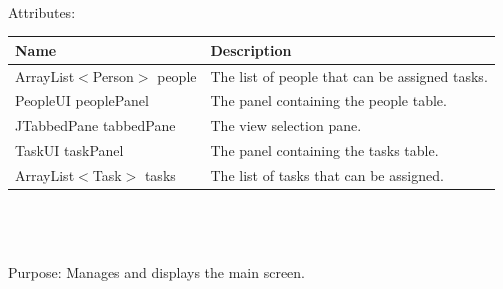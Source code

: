 \\
Attributes: \\
\begin{tabular}{| l | l |}
\hline
Name & Description\\
\hline
ArrayList$<$Person$>$ people & The list of people that can be assigned tasks.\\
\hline
PeopleUI peoplePanel & The panel containing the people table.\\
\hline
JTabbedPane tabbedPane & The view selection pane.\\
\hline
TaskUI taskPanel & The panel containing the tasks table.\\
\hline
ArrayList$<$Task$>$ tasks & The list of tasks that can be assigned.\\
\hline
\end{tabular}\\
\\
\\
Purpose: Manages and displays the main screen.\\
\\
\\